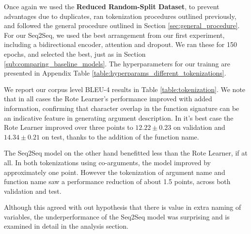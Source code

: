 Once again we used the \textbf{Reduced Random-Split Dataset}, to prevent advantages due to duplicates, ran tokenization procedures outlined previously, and followed the general procedure outlined in Section \ref{sec:general_procedure}. For our Seq2Seq, we used the best arrangement from our first experiment, including a bidirectional encoder, attention and dropout. We ran these for 150 epochs, and selected the best, just as in Section \ref{sub:comparing_baseline_models}. The hyperparameters for our trainng are presented in Appendix Table \ref{table:hyperparams_different_tokenizations}.

We report our corpus level BLEU-4 results in Table \ref{table:tokenization}. 
We note that in all cases the Rote Learner's performance improved with added information, confirming that character overlap in the function signature can be an indicative feature in generating argument description.
In it's best case the Rote Learner improved over three points to $12.22 \pm 0.23$ on validation and $14.34 \pm 0.21$ on test, thanks to the addition of the function name. 

The Seq2Seq model on the other hand benefitted less than the Rote Learner, if at all. In both tokenizations using co-arguments, the model improved by approximately one point. However the tokenization of argument name and function name saw a performance reduction of about 1.5 points, across both validation and test.

Although this agreed with out hypothesis that there is value in extra naming of variables, the underperformance of the Seq2Seq model was surprising and is examined in detail in the analysis section.

